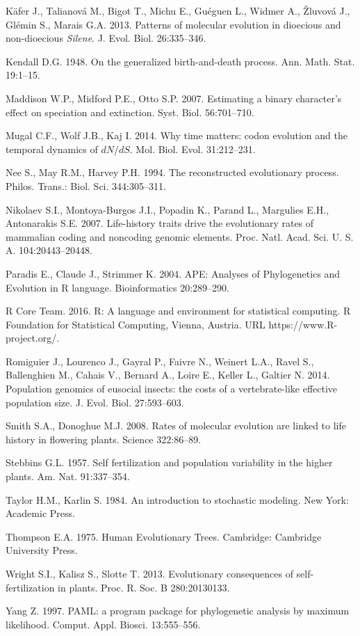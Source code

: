 \documentclass[a4paper,11pt]{article}
\theoremstyle{plain}
\theoremstyle{definition}
\numberwithin{equation}{section}
\begin{document}
\begin{thebibliography}{}
K\"{a}fer J., Talianov\'{a} M., Bigot T., Michu E., Gu\'{e}guen L., Widmer A., \v{Z}luvov\'{a} J., Gl\'{e}min S., Marais G.A. 
2013. Patterns of molecular evolution in dioecious and non-dioecious \textit{Silene}. J. Evol. Biol. 26:335--346.

Kendall D.G. 1948. On the generalized  birth-and-death process. Ann. Math. Stat. 19:1--15.  
 
Maddison W.P., Midford P.E., Otto S.P. 2007. Estimating a binary character's effect 
on speciation and extinction. Syst. Biol. 56:701--710. 

Mugal C.F., Wolf J.B., Kaj I. 2014. Why time matters: codon evolution and the temporal dynamics of 
$dN/dS$. Mol. Biol. Evol. 31:212--231.

Nee S., May R.M., Harvey P.H. 1994. The reconstructed evolutionary process. 
Philos. Trans.: Biol. Sci.	 344:305--311.
 
 Nikolaev S.I., Montoya-Burgos J.I., Popadin K., Parand L., Margulies E.H., Antonarakis S.E. 2007. 
 Life-history traits drive the evolutionary rates of mammalian coding and noncoding genomic elements. 
 Proc. Natl. Acad. Sci. U. S. A. 104:20443--20448.

Paradis E., Claude J., Strimmer K. 2004. APE: Analyses of Phylogenetics and Evolution in  R language. 
Bioinformatics 20:289--290.


R Core Team. 2016. R: A language and environment for statistical computing. 
R Foundation for Statistical Computing, Vienna, Austria. URL https://www.R-project.org/.
 
Romiguier J., Lourenco J., Gayral P., Faivre N., Weinert L.A., Ravel S., Ballenghien M., Cahais V., 
Bernard A., Loire E., Keller L., Galtier N. 2014. 
Population genomics of eusocial insects: the costs of a vertebrate-like effective population size. 
J. Evol. Biol. 27:593--603.
 
Smith S.A., Donoghue M.J. 2008. Rates of molecular evolution are linked to life history in flowering plants. 
Science 322:86--89.
 
Stebbins G.L. 1957. Self fertilization and population variability in the higher plants. 
Am. Nat. 91:337--354.
 
Taylor H.M., Karlin S. 1984. An introduction to stochastic modeling. New York: Academic Press. 
 
Thompson E.A. 1975. Human Evolutionary Trees. Cambridge: Cambridge University Press. 
 
Wright S.I., Kalisz S., Slotte T. 2013. Evolutionary consequences of self-fertilization in plants. 
Proc. R. Soc. B 280:20130133.

Yang Z. 1997. PAML: a program package for phylogenetic analysis by maximum likelihood. 
Comput. Appl. Biosci. 13:555--556.


\end{thebibliography}
\end{document}
